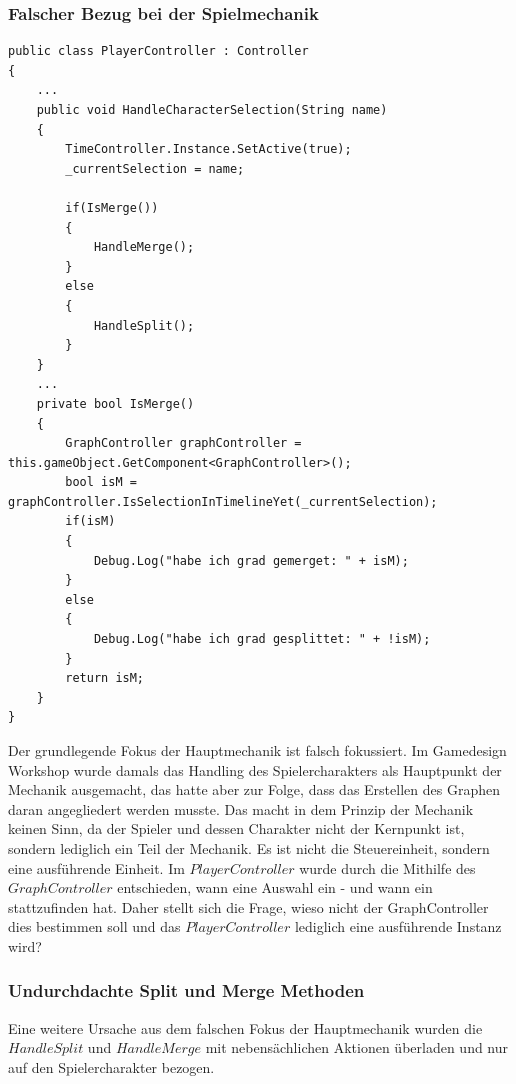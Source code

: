 \subsubsection{Falscher Bezug bei der Spielmechanik}
\begin{lstlisting}[caption={HandleCharacterSelection im PlayerController Skript}, label={sec:playercontroller_old}]
public class PlayerController : Controller
{
    ...
    public void HandleCharacterSelection(String name)
    {
        TimeController.Instance.SetActive(true);
        _currentSelection = name;
        
        if(IsMerge())
        {
            HandleMerge();
        }
        else
        {
            HandleSplit();
        }
    }
    ...
    private bool IsMerge()
    {
        GraphController graphController = this.gameObject.GetComponent<GraphController>();
        bool isM = graphController.IsSelectionInTimelineYet(_currentSelection);
        if(isM)
        {   
            Debug.Log("habe ich grad gemerget: " + isM);
        }
        else
        {
            Debug.Log("habe ich grad gesplittet: " + !isM);
        }
        return isM;
    }
}
\end{lstlisting}
Der grundlegende Fokus der Hauptmechanik ist falsch fokussiert. Im Gamedesign Workshop wurde damals das Handling des Spielercharakters als Hauptpunkt der Mechanik ausgemacht, das hatte aber zur Folge, dass das Erstellen des Graphen daran angegliedert werden musste. Das macht in dem Prinzip der Mechanik keinen Sinn, da der Spieler und dessen Charakter nicht der Kernpunkt ist, sondern lediglich ein Teil der Mechanik. Es ist nicht die Steuereinheit, sondern eine ausführende Einheit. Im $PlayerController$ wurde durch die Mithilfe des $GraphController$ entschieden, wann eine Auswahl ein - und wann ein  stattzufinden hat. Daher stellt sich die Frage, wieso nicht der GraphController dies bestimmen soll und das $PlayerController$ lediglich eine ausführende Instanz wird?

\subsubsection{Undurchdachte Split und Merge Methoden}
Eine weitere Ursache aus dem falschen Fokus der Hauptmechanik wurden die $HandleSplit$ und $HandleMerge$ mit nebensächlichen Aktionen überladen und nur auf den Spielercharakter bezogen.

